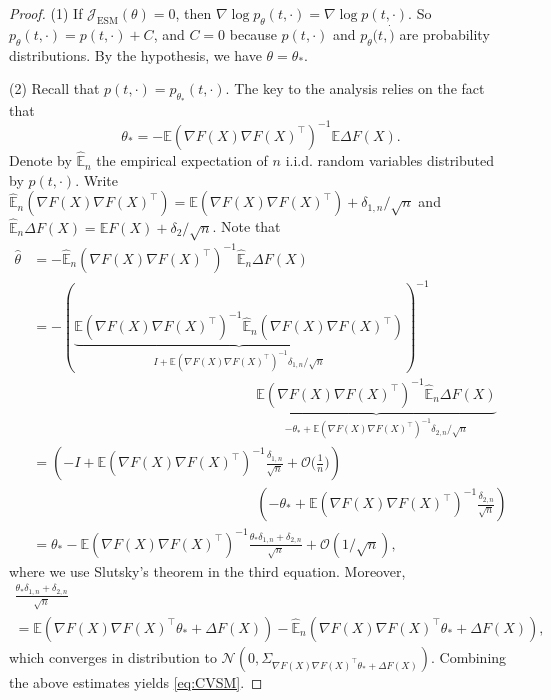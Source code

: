 \documentclass[letterpaper,11pt,reqno]{amsart}
\numberwithin{equation}{section}
\begin{document}
\begin{proof}
(1) If $\mathcal{J}_{\text{ESM}}(\theta) = 0$,
 then $\nabla \log p_\theta (t, \cdot) = \nabla \log p (t, \cdot)$.
So $p_\theta (t, \cdot) = p(t, \cdot) + C$, 
and $C = 0$ because $p(t, \cdot)$ and $p_\theta(t, \dot)$ are probability distributions.
By the hypothesis, we have $\theta = \theta_*$.

(2) Recall that $p(t, \cdot) = p_{\theta_*}(t, \cdot)$.
The key to the analysis relies on the fact that
\begin{equation}
\theta_* = - \mathbb{E}(\nabla F(X) \nabla F(X)^\top)^{-1} \mathbb{E} \Delta F(X).
\end{equation}
Denote by $\widehat{\mathbb{E}}_n$ the empirical expectation of $n$ i.i.d. random variables distributed by $p(t, \cdot)$.
Write
$\widehat{\mathbb{E}}_n(\nabla F(X) \nabla F(X)^\top) = \mathbb{E}(\nabla F(X) \nabla F(X)^\top) + \delta_{1,n}/\sqrt{n}$
and 
$\widehat{\mathbb{E}}_n \Delta F(X) = \mathbb{E} F(X) + \delta_2/\sqrt{n}$.
Note that
\begin{equation*}
\begin{aligned}
\widehat{\theta}
& = - \widehat{\mathbb{E}}_n(\nabla F(X) \nabla F(X)^\top)^{-1} \widehat{\mathbb{E}}_n\Delta F(X) \\
& = - \left( \underbrace{\mathbb{E}(\nabla F(X) \nabla F(X)^\top)^{-1} \widehat{\mathbb{E}}_n(\nabla F(X) \nabla F(X)^\top)}_{I + \mathbb{E}(\nabla F(X) \nabla F(X)^\top)^{-1} \delta_{1,n}/\sqrt{n}}  \right)^{-1} \\
& \qquad \qquad \qquad \qquad \qquad \qquad \qquad \qquad \underbrace{\mathbb{E}(\nabla F(X) \nabla F(X)^\top)^{-1} \widehat{\mathbb{E}}_n\Delta F(X)}_{-\theta_* + \mathbb{E}(\nabla F(X) \nabla F(X)^\top)^{-1} \delta_{2,n}/\sqrt{n}} \\
& = \left( -I + \mathbb{E}(\nabla F(X) \nabla F(X)^\top)^{-1} \frac{\delta_{1,n}}{\sqrt{n}} + \mathcal{O}\bigg(\frac{1}{n}\bigg)\right) \\
& \qquad \qquad \qquad \qquad \qquad \qquad \qquad \qquad \left(-\theta_* + \mathbb{E}(\nabla F(X) \nabla F(X)^\top)^{-1} \frac{\delta_{2,n}}{\sqrt{n}} \right) \\
&= \theta_* - \mathbb{E}(\nabla F(X) \nabla F(X)^\top)^{-1} \frac{\theta_* \delta_{1,n} + \delta_{2,n}}{\sqrt{n}} + \mathcal{O}(1/\sqrt{n}),
\end{aligned}
\end{equation*}
where we use Slutsky's theorem in the third equation.
Moreover, 
\begin{multline*}
\frac{\theta_* \delta_{1,n} + \delta_{2,n}}{\sqrt{n}} \\ = \mathbb{E}(\nabla F(X) \nabla F(X)^\top \theta_* + \Delta F(X)) - \widehat{\mathbb{E}}_n(\nabla F(X) \nabla F(X)^\top \theta_* + \Delta F(X)),
\end{multline*}
which converges in distribution to $\mathcal{N}(0, \Sigma_{\nabla F(X) \nabla F(X)^\top \theta_* + \Delta F(X)})$.
Combining the above estimates yields \eqref{eq:CVSM}.
\end{proof}
\end{document}
